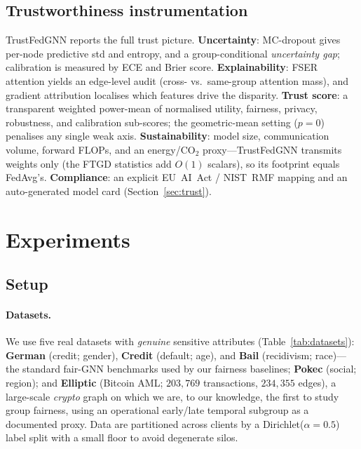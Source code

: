 \documentclass[pdflatex,sn-mathphys-num]{sn-jnl}
\theoremstyle{thmstyleone}%
\theoremstyle{thmstyletwo}%
\theoremstyle{thmstylethree}%
\begin{document}
\subsection{Trustworthiness instrumentation}
\label{sec:method-trust}
TrustFedGNN reports the full trust picture. \textbf{Uncertainty}: MC-dropout gives
per-node predictive std and entropy, and a group-conditional \emph{uncertainty
gap}; calibration is measured by ECE and Brier score.
\textbf{Explainability}: FSER attention yields an edge-level audit (cross- vs.\
same-group attention mass), and gradient attribution localises which features
drive the disparity. \textbf{Trust score}: a transparent weighted power-mean of
normalised utility, fairness, privacy, robustness, and calibration sub-scores;
the geometric-mean setting ($p{=}0$) penalises any single weak axis.
\textbf{Sustainability}: model size, communication volume, forward FLOPs, and an
energy/CO$_2$ proxy---TrustFedGNN transmits weights only (the FTGD statistics add
$O(1)$ scalars), so its footprint equals FedAvg's. \textbf{Compliance}: an
explicit EU~AI~Act / NIST~RMF mapping and an auto-generated model card
(Section~\ref{sec:trust}).

\section{Experiments}
\label{sec:experiments}

\subsection{Setup}
\label{sec:setup}
\paragraph{Datasets.}
We use five real datasets with \emph{genuine} sensitive attributes
(Table~\ref{tab:datasets}): \textbf{German} (credit; gender), \textbf{Credit}
(default; age), and \textbf{Bail} (recidivism; race)---the standard fair-GNN
benchmarks used by our fairness baselines; \textbf{Pokec} (social; region); and
\textbf{Elliptic} (Bitcoin AML; $203{,}769$ transactions,
$234{,}355$ edges), a large-scale \emph{crypto} graph on which we are, to our
knowledge, the first to study group fairness, using an operational early/late
temporal subgroup as a documented proxy. Data are partitioned across clients by
a Dirichlet($\alpha{=}0.5$) label split with a small floor to avoid degenerate
silos.

\begin{table}[t]\centering\small
\caption{Datasets. $^\dagger$Elliptic uses an operational early/late temporal
subgroup as a documented proxy (not a protected demographic).}
\label{tab:datasets}

\end{table}
\end{document}
